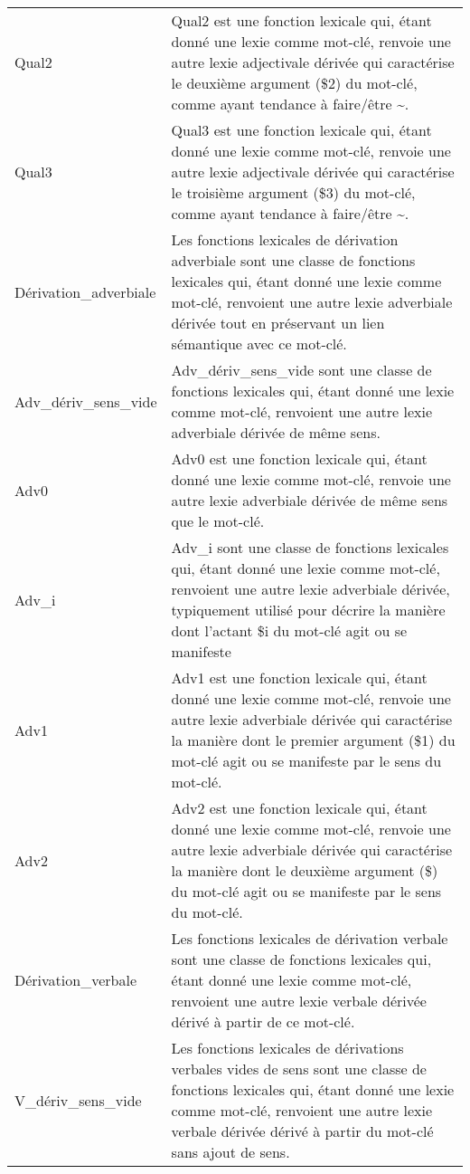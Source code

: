 \begin{longtable}{ll}
Qual2 & Qual2 est une fonction lexicale qui, étant donné une lexie comme mot-clé, renvoie une autre lexie adjectivale dérivée qui caractérise le deuxième argument (\$2) du mot-clé, comme ayant tendance à faire/être \textasciitilde . \\
Qual3 & Qual3 est une fonction lexicale qui, étant donné une lexie comme mot-clé, renvoie une autre lexie adjectivale dérivée qui caractérise le troisième argument (\$3) du mot-clé, comme ayant tendance à faire/être \textasciitilde . \\
Dérivation\_adverbiale & Les fonctions lexicales de dérivation adverbiale sont une classe de fonctions lexicales qui, étant donné une lexie comme mot-clé, renvoient une autre lexie adverbiale dérivée tout en préservant un lien sémantique avec ce mot-clé. \\
Adv\_dériv\_sens\_vide & Adv\_dériv\_sens\_vide sont une classe de fonctions lexicales qui, étant donné une lexie comme mot-clé, renvoient une autre lexie adverbiale dérivée de même sens. \\
Adv0 & Adv0 est une fonction lexicale qui, étant donné une lexie comme mot-clé, renvoie une autre lexie adverbiale dérivée de même sens que le mot-clé. \\
Adv\_i & Adv\_i sont une classe de fonctions lexicales qui, étant donné une lexie comme mot-clé, renvoient une autre lexie adverbiale dérivée, typiquement utilisé pour décrire la manière dont l'actant \$i du mot-clé agit ou se manifeste \\
Adv1 & Adv1 est une fonction lexicale qui, étant donné une lexie comme mot-clé, renvoie une autre lexie adverbiale dérivée qui caractérise la manière dont le premier argument (\$1) du mot-clé agit ou se manifeste par le sens du mot-clé. \\
Adv2 & Adv2 est une fonction lexicale qui, étant donné une lexie comme mot-clé, renvoie une autre lexie adverbiale dérivée qui caractérise la manière dont le deuxième argument (\$) du mot-clé agit ou se manifeste par le sens du mot-clé. \\
Dérivation\_verbale & Les fonctions lexicales de dérivation verbale sont une classe de fonctions lexicales qui, étant donné une lexie comme mot-clé, renvoient une autre lexie verbale dérivée dérivé à partir de ce mot-clé. \\
V\_dériv\_sens\_vide & Les fonctions lexicales de dérivations verbales vides de sens sont une classe de fonctions lexicales qui, étant donné une lexie comme mot-clé, renvoient une autre lexie verbale dérivée dérivé à partir du mot-clé sans ajout de sens. \\

\end{longtable}
